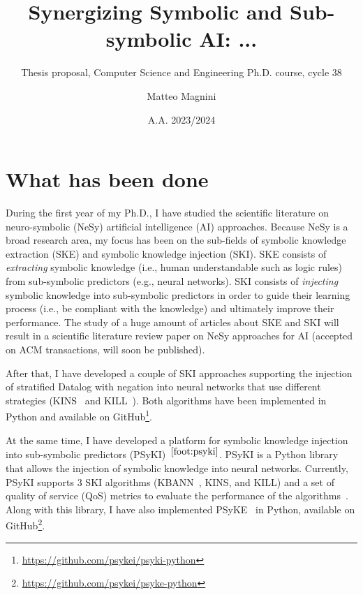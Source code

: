 \documentclass[]{scrartcl}
\title{
    Synergizing Symbolic and Sub-symbolic AI: ...
}
\subtitle{Thesis proposal, Computer Science and Engineering Ph.D. course, cycle 38}
\author{Matteo Magnini}
\date{A.A. 2023/2024}
\begin{document}
    
    \maketitle
    
    \begin{abstract}
        
    \end{abstract}
    
    \section{What has been done}
    \label{sec:done}

    During the first year of my Ph.D., I have studied the scientific literature on neuro-symbolic (NeSy) artificial intelligence (AI) approaches.
    Because NeSy is a broad research area, my focus has been on the sub-fields of symbolic knowledge extraction (SKE) and symbolic knowledge injection (SKI).
    SKE consists of \emph{extracting} symbolic knowledge (i.e., human understandable such as logic rules) from sub-symbolic predictors (e.g., neural networks).
    SKI consists of \emph{injecting} symbolic knowledge into sub-symbolic predictors in order to guide their learning process (i.e., be compliant with the knowledge) and ultimately improve their performance.
    The study of a huge amount of articles about SKE and SKI will result in a scientific literature review paper on NeSy approaches for AI (accepted on ACM transactions, will soon be published).

    After that, I have developed a couple of SKI approaches supporting the injection of stratified Datalog with negation into neural networks that use different strategies (KINS~\cite{kins-cilc2022} and KILL~\cite{kill-woa2022}).
    Both algorithms have been implemented in Python and available on GitHub\footnote{\label{foot:psyki}\url{https://github.com/psykei/psyki-python}}.

    At the same time, I have developed a platform for symbolic knowledge injection into sub-symbolic predictors (PSyKI)~\cite{psyki-extraamas2022}$^{\ref{foot:psyki}}$.
    PSyKI is a Python library that allows the injection of symbolic knowledge into neural networks.
    Currently, PSyKI supports 3 SKI algorithms (KBANN~\cite{TowellAaai1990}, KINS, and KILL) and a set of quality of service (QoS) metrics to evaluate the performance of the algorithms~\cite{skiqos-jaamas37}.
    Along with this library, I have also implemented PSyKE~\cite{psyke-woa2021} in Python, available on GitHub\footnote{\label{foot:psyke}\url{https://github.com/psykei/psyke-python}}.
\end{document}
